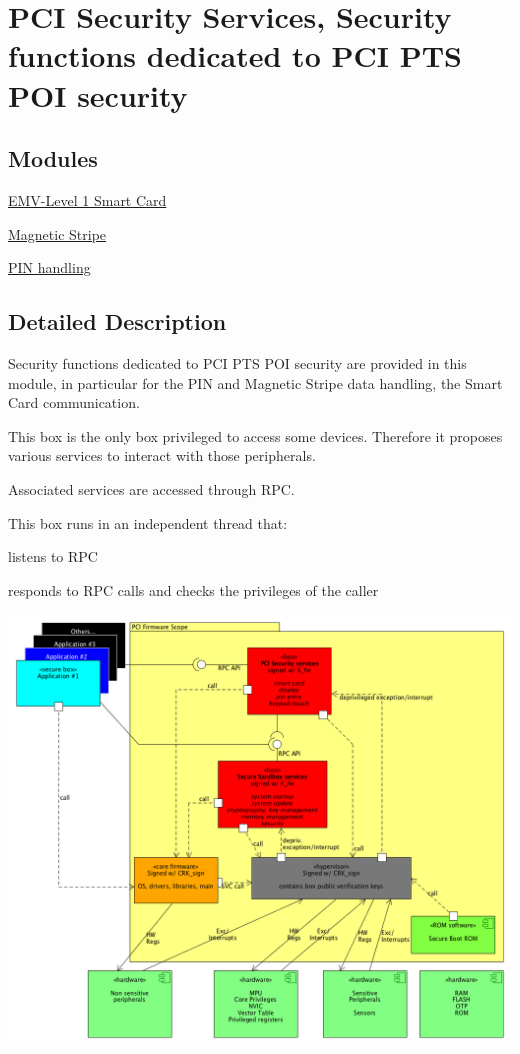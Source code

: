 \hypertarget{group__pcibx}{}\section{P\+CI Security Services, Security functions dedicated to P\+CI P\+TS P\+OI security}
\label{group__pcibx}
\subsection*{Modules}
\begin{DoxyCompactItemize}
\item
\hyperlink{group__pcibx__sc}{E\+M\+V-\/\+Level 1 Smart Card}
\item
\hyperlink{group__pcibx___m_s_r}{Magnetic Stripe}
\item
\hyperlink{group__pcibx___p_i_n}{P\+I\+N handling}
\end{DoxyCompactItemize}


\subsection{Detailed Description}
Security functions dedicated to P\+CI P\+TS P\+OI security are provided in this module, in particular for the P\+IN and Magnetic Stripe data handling, the Smart Card communication.

This box is the only box privileged to access some devices. Therefore it proposes various services to interact with those peripherals.

Associated services are accessed through R\+PC.

This box runs in an independent thread that\+:
\begin{DoxyItemize}
\item listens to R\+PC
\item responds to R\+PC calls and checks the privileges of the caller
\end{DoxyItemize}


\begin{DoxyImageNoCaption}
  \mbox{\includegraphics[width=\textwidth, height=\textheight/2, keepaspectratio=true]{pci_cortex.png}}
\end{DoxyImageNoCaption}
  